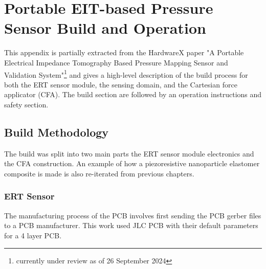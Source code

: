 \chapter{Portable EIT-based Pressure Sensor Build and Operation}
\label{appendix-E}

This appendix is partially extracted from the HardwareX paper "A Portable Electrical Impedance Tomography Based Pressure Mapping Sensor and Validation System"\footnote{currently under review as of 26 September 2024} and gives a high-level description of the build process for both the ERT sensor module, the sensing domain, and the Cartesian force applicator (CFA). The build section are followed by an operation instructions and safety section.

\section{Build Methodology}
The build was split into two main parts the ERT sensor module electronics and the CFA construction. An example of how a piezoresistive nanoparticle elastomer composite is made is also re-iterated from previous chapters.


\subsection{ERT Sensor}
The manufacturing process of the PCB involves first sending the PCB gerber files to a PCB manufacturer. This work used JLC PCB with their default parameters for a 4 layer PCB.

